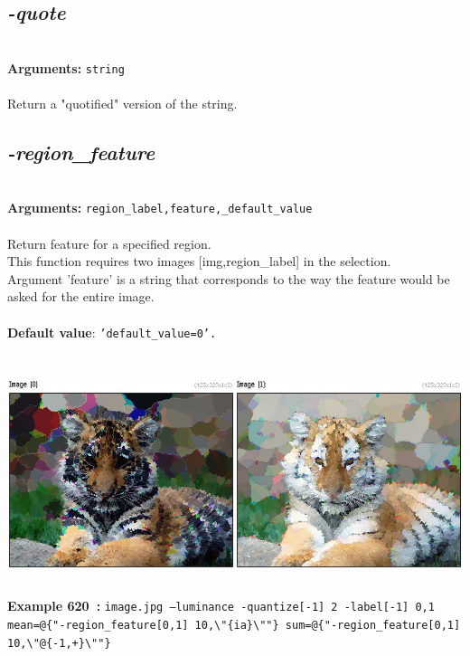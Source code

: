 \documentclass[a4paper,11pt,twoside]{book}
\begin{document}
\subsection{\emph{-quote} }\vspace*{-0.5em}
~\\\textbf{Arguments: } 
{\small \texttt{string}}\\~\\
Return a "quotified" version of the string.


\subsection{\emph{-region\_feature} }\vspace*{-0.5em}
~\\\textbf{Arguments: } 
{\small \texttt{region\_label,feature,\_default\_value}}\\~\\
Return feature for a specified region.
~\\This function requires two images [img,region\_label] in the selection.
~\\Argument 'feature' is a string that corresponds to the way the feature would
be asked for the entire image.
~\\~\\\textbf{Default value}: {\small \texttt{'default\_value=0'.}}
\begin{center}\includegraphics[keepaspectratio=true,height=7cm,width=\textwidth]{img/gmic_def620.jpg}\\
{\footnotesize \textbf{Example 620~:} \texttt{image.jpg --luminance -quantize[-1] 2 -label[-1] 0,1 mean=@\{"-region\_feature[0,1] 10,\textbackslash "\{ia\}\textbackslash ""\} sum=@\{"-region\_feature[0,1] 10,\textbackslash "@\{-1,+\}\textbackslash ""\}}}
\end{center}
\end{document}
